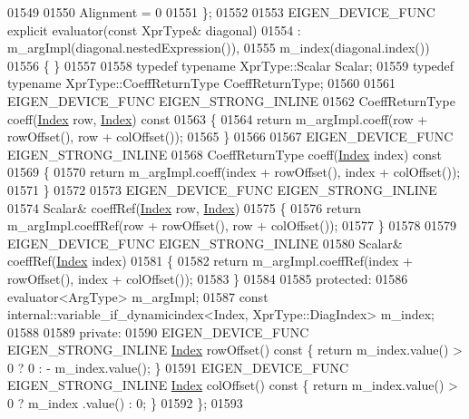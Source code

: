 \begin{DoxyCode}
01549     
01550     Alignment = 0
01551   \};
01552 
01553   EIGEN\_DEVICE\_FUNC \textcolor{keyword}{explicit} evaluator(\textcolor{keyword}{const} XprType& diagonal)
01554     : m\_argImpl(diagonal.nestedExpression()),
01555       m\_index(diagonal.index())
01556   \{ \}
01557  
01558   \textcolor{keyword}{typedef} \textcolor{keyword}{typename} XprType::Scalar Scalar;
01559   \textcolor{keyword}{typedef} \textcolor{keyword}{typename} XprType::CoeffReturnType CoeffReturnType;
01560 
01561   EIGEN\_DEVICE\_FUNC EIGEN\_STRONG\_INLINE
01562   CoeffReturnType coeff(\hyperlink{namespace_eigen_a62e77e0933482dafde8fe197d9a2cfde}{Index} row, \hyperlink{namespace_eigen_a62e77e0933482dafde8fe197d9a2cfde}{Index})\textcolor{keyword}{ const}
01563 \textcolor{keyword}{  }\{
01564     \textcolor{keywordflow}{return} m\_argImpl.coeff(row + rowOffset(), row + colOffset());
01565   \}
01566 
01567   EIGEN\_DEVICE\_FUNC EIGEN\_STRONG\_INLINE
01568   CoeffReturnType coeff(\hyperlink{namespace_eigen_a62e77e0933482dafde8fe197d9a2cfde}{Index} index)\textcolor{keyword}{ const}
01569 \textcolor{keyword}{  }\{
01570     \textcolor{keywordflow}{return} m\_argImpl.coeff(index + rowOffset(), index + colOffset());
01571   \}
01572 
01573   EIGEN\_DEVICE\_FUNC EIGEN\_STRONG\_INLINE
01574   Scalar& coeffRef(\hyperlink{namespace_eigen_a62e77e0933482dafde8fe197d9a2cfde}{Index} row, \hyperlink{namespace_eigen_a62e77e0933482dafde8fe197d9a2cfde}{Index})
01575   \{
01576     \textcolor{keywordflow}{return} m\_argImpl.coeffRef(row + rowOffset(), row + colOffset());
01577   \}
01578 
01579   EIGEN\_DEVICE\_FUNC EIGEN\_STRONG\_INLINE
01580   Scalar& coeffRef(\hyperlink{namespace_eigen_a62e77e0933482dafde8fe197d9a2cfde}{Index} index)
01581   \{
01582     \textcolor{keywordflow}{return} m\_argImpl.coeffRef(index + rowOffset(), index + colOffset());
01583   \}
01584 
01585 \textcolor{keyword}{protected}:
01586   evaluator<ArgType> m\_argImpl;
01587   \textcolor{keyword}{const} internal::variable\_if\_dynamicindex<Index, XprType::DiagIndex> m\_index;
01588 
01589 \textcolor{keyword}{private}:
01590   EIGEN\_DEVICE\_FUNC EIGEN\_STRONG\_INLINE \hyperlink{namespace_eigen_a62e77e0933482dafde8fe197d9a2cfde}{Index} rowOffset()\textcolor{keyword}{ const }\{ \textcolor{keywordflow}{return} m\_index.value() > 0 ? 0 : -
      m\_index.value(); \}
01591   EIGEN\_DEVICE\_FUNC EIGEN\_STRONG\_INLINE \hyperlink{namespace_eigen_a62e77e0933482dafde8fe197d9a2cfde}{Index} colOffset()\textcolor{keyword}{ const }\{ \textcolor{keywordflow}{return} m\_index.value() > 0 ? m\_index
      .value() : 0; \}
01592 \};
01593 

\end{DoxyCode}
